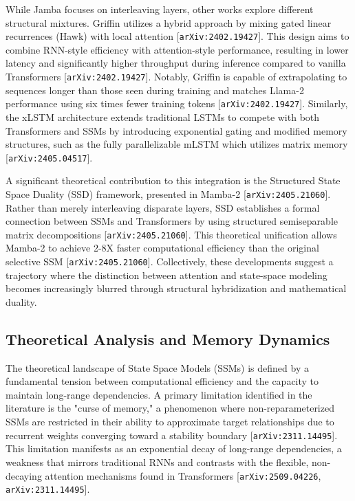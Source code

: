 \documentclass[11pt]{article}
\begin{document}
While Jamba focuses on interleaving layers, other works explore different structural mixtures. Griffin utilizes a hybrid approach by mixing gated linear recurrences (Hawk) with local attention [\texttt{arXiv:2402.19427}]. This design aims to combine RNN-style efficiency with attention-style performance, resulting in lower latency and significantly higher throughput during inference compared to vanilla Transformers [\texttt{arXiv:2402.19427}]. Notably, Griffin is capable of extrapolating to sequences longer than those seen during training and matches Llama-2 performance using six times fewer training tokens [\texttt{arXiv:2402.19427}]. Similarly, the xLSTM architecture extends traditional LSTMs to compete with both Transformers and SSMs by introducing exponential gating and modified memory structures, such as the fully parallelizable mLSTM which utilizes matrix memory [\texttt{arXiv:2405.04517}].

A significant theoretical contribution to this integration is the Structured State Space Duality (SSD) framework, presented in Mamba-2 [\texttt{arXiv:2405.21060}]. Rather than merely interleaving disparate layers, SSD establishes a formal connection between SSMs and Transformers by using structured semiseparable matrix decompositions [\texttt{arXiv:2405.21060}]. This theoretical unification allows Mamba-2 to achieve 2-8X faster computational efficiency than the original selective SSM [\texttt{arXiv:2405.21060}]. Collectively, these developments suggest a trajectory where the distinction between attention and state-space modeling becomes increasingly blurred through structural hybridization and mathematical duality.

\subsection{Theoretical Analysis and Memory Dynamics}

The theoretical landscape of State Space Models (SSMs) is defined by a fundamental tension between computational efficiency and the capacity to maintain long-range dependencies. A primary limitation identified in the literature is the "curse of memory," a phenomenon where non-reparameterized SSMs are restricted in their ability to approximate target relationships due to recurrent weights converging toward a stability boundary [\texttt{arXiv:2311.14495}]. This limitation manifests as an exponential decay of long-range dependencies, a weakness that mirrors traditional RNNs and contrasts with the flexible, non-decaying attention mechanisms found in Transformers [\texttt{arXiv:2509.04226}, \texttt{arXiv:2311.14495}].
\end{document}
